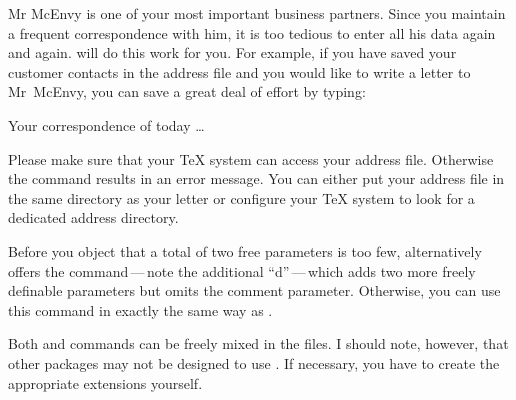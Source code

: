 \begin{Example}
  Mr McEnvy is one of your most important business partners. Since you
  maintain a frequent correspondence with him, it is too tedious to
  enter all his data again and again. \KOMAScript{} will do this work for you.
  For example, if you have saved your customer contacts in the
   address file and you would like to write a letter to
  Mr~McEnvy, you can save a great deal of effort by typing:
  \begin{lstcode}
    
    \begin{letter}{\FLANN}
      Your correspondence of today \dots
    \end{letter}
  \end{lstcode}
  Please make sure that your {\TeX} system can access your address file.
  Otherwise the  command results in an error message. You can
  either put your address file in the same directory as your letter or
  configure your \TeX{} system to look for a dedicated address directory.
\end{Example}
%
\EndIndexGroup


\begin{Declaration}
\end{Declaration}%
Before you object that a total of two free parameters is too few,
\KOMAScript{} alternatively offers the  command\,---\,note
the additional ``d''\,---\,which adds two more freely definable parameters but
omits the comment parameter. Otherwise, you can use this command in exactly
the same way as .

Both  and  commands can be
freely mixed in the  files. I should note, however, that other
packages may not be designed to use . If necessary, you have
to create the appropriate extensions yourself.%
%
\EndIndexGroup

